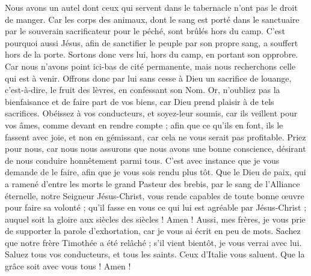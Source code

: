 \begin{multicols}{2}
Nous avons un autel dont ceux qui servent dans le tabernacle n'ont pas le droit de manger.
Car les corps des animaux, dont le sang est porté dans le sanctuaire par le souverain sacrificateur pour le péché, sont brûlés hors du camp.
C'est pourquoi aussi Jésus, afin de sanctifier le peuple par son propre sang, a souffert hors de la porte.
Sortons donc vers lui, hors du camp, en portant son opprobre.
Car nous n'avons point ici-bas de cité permanente, mais nous recherchons celle qui est à venir.
Offrons donc par lui sans cesse à Dieu un sacrifice de louange, c'est-à-dire, le fruit des lèvres, en confessant son Nom.
Or, n'oubliez pas la bienfaisance et de faire part de vos biens, car Dieu prend plaisir à de tels sacrifices.
Obéissez à vos conducteurs, et soyez-leur soumis, car ils veillent pour vos âmes, comme devant en rendre compte ; afin que ce qu'ils en font, ils le fassent avec joie, et non en gémissant, car cela ne vous serait pas profitable.
 Priez pour nous, car nous nous assurons que nous avons une bonne conscience, désirant de nous conduire honnêtement parmi tous.
C'est avec instance que je vous demande de le faire, afin que je vous sois rendu plus tôt.
Que le Dieu de paix, qui a ramené d'entre les morts le grand Pasteur des brebis, par le sang de l'Alliance éternelle, notre Seigneur Jésus-Christ,
vous rende capables de toute bonne œuvre pour faire sa volonté ; qu'il fasse en vous ce qui lui est agréable par Jésus-Christ ; auquel soit la gloire aux siècles des siècles ! Amen !
Aussi, mes frères, je vous prie de supporter la parole d'exhortation, car je vous ai écrit en peu de mots.
Sachez que notre frère Timothée a été relâché ; s'il vient bientôt, je vous verrai avec lui.
Saluez tous vos conducteurs, et tous les saints. Ceux d'Italie vous saluent.
Que la grâce soit avec vous tous ! Amen !
\PPE{}
\end{multicols}
